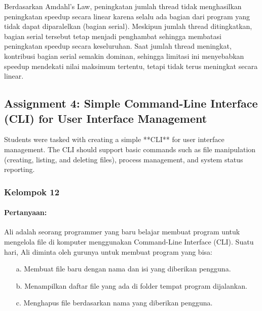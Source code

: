 \documentclass[12pt]{article}
\begin{document}
Berdasarkan Amdahl's Law, peningkatan jumlah thread tidak menghasilkan peningkatan speedup secara linear karena selalu ada bagian dari program yang tidak dapat diparalelkan (bagian serial). Meskipun jumlah thread ditingkatkan, bagian serial tersebut tetap menjadi penghambat sehingga membatasi peningkatan speedup secara keseluruhan. Saat jumlah thread meningkat, kontribusi bagian serial semakin dominan, sehingga limitasi ini menyebabkan speedup mendekati nilai maksimum tertentu, tetapi tidak terus meningkat secara linear.


\subsection{Assignment 4: Simple Command-Line Interface (CLI) for User Interface Management}
Students were tasked with creating a simple **CLI** for user interface management. The CLI should support basic commands such as file manipulation (creating, listing, and deleting files), process management, and system status reporting.




\subsubsection{Kelompok 12}

\paragraph{Pertanyaan:}
Ali adalah seorang programmer yang baru belajar membuat program untuk mengelola file di komputer menggunakan Command-Line Interface (CLI). Suatu hari, Ali diminta oleh gurunya untuk membuat program yang bisa:

\begin{enumerate}
    \item[a.] Membuat file baru dengan nama dan isi yang diberikan pengguna.
    \item[b.] Menampilkan daftar file yang ada di folder tempat program dijalankan.
    \item[c.] Menghapus file berdasarkan nama yang diberikan pengguna.
\end{enumerate}
\end{document}
